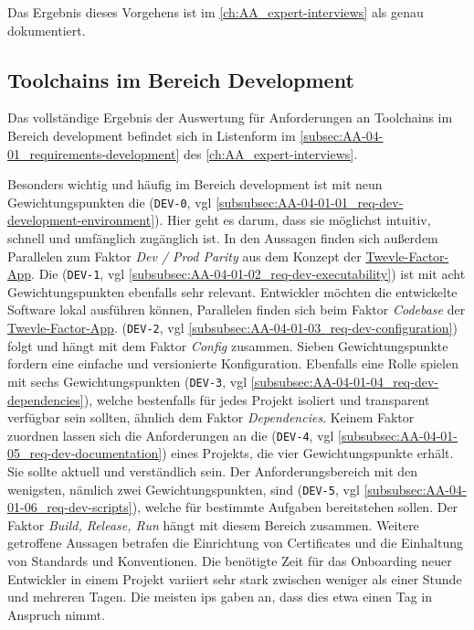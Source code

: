 Das Ergebnis dieses Vorgehens ist im \autoref{ch:AA_expert-interviews} als  genau dokumentiert.

\subsection{Toolchains im Bereich Development}
\label{subsec:04-02-02_toolchains-in-development}

Das vollständige Ergebnis der Auswertung für Anforderungen an Toolchains im Bereich \Gls{development} befindet sich in Listenform im \autoref{subsec:AA-04-01_requirements-development} des \autoref{ch:AA_expert-interviews}.

Besonders wichtig und häufig im Bereich \Gls{development} ist mit neun Gewichtungspunkten die \textbf{} (\texttt{DEV-0}, \acrshort{vgl} \autoref{subsubsec:AA-04-01-01_req-dev-development-environment}). Hier geht es darum, dass sie möglichst intuitiv, schnell und umfänglich zugänglich ist. In den Aussagen finden sich außerdem Parallelen zum Faktor \textit{Dev / Prod Parity} aus dem Konzept der \hyperref[sec:03-05_basic-idea-of-twelve-factor-app]{Twevle-Factor-App}. Die \textbf{} (\texttt{DEV-1}, \acrshort{vgl} \autoref{subsubsec:AA-04-01-02_req-dev-executability}) ist mit acht Gewichtungspunkten ebenfalls sehr relevant. Entwickler möchten die entwickelte Software lokal ausführen können, Parallelen finden sich beim Faktor \textit{Codebase} der \hyperref[sec:03-05_basic-idea-of-twelve-factor-app]{Twevle-Factor-App}. \textbf{} (\texttt{DEV-2}, \acrshort{vgl} \autoref{subsubsec:AA-04-01-03_req-dev-configuration}) folgt und hängt mit dem Faktor \textit{Config} zusammen. Sieben Gewichtungspunkte fordern eine einfache und versionierte Konfiguration. Ebenfalls eine Rolle spielen mit sechs Gewichtungspunkten \textbf{} (\texttt{DEV-3}, \acrshort{vgl} \autoref{subsubsec:AA-04-01-04_req-dev-dependencies}), welche bestenfalls für jedes Projekt isoliert und transparent verfügbar sein sollten, ähnlich dem Faktor \textit{Dependencies}. Keinem Faktor zuordnen lassen sich die Anforderungen an die \textbf{} (\texttt{DEV-4}, \acrshort{vgl} \autoref{subsubsec:AA-04-01-05_req-dev-documentation}) eines Projekts, die vier Gewichtungspunkte erhält. Sie sollte aktuell und verständlich sein. Der Anforderungsbereich mit den wenigsten, nämlich zwei Gewichtungspunkten, sind \textbf{} (\texttt{DEV-5}, \acrshort{vgl} \autoref{subsubsec:AA-04-01-06_req-dev-scripts}), welche für bestimmte Aufgaben bereitstehen sollen. Der Faktor \textit{Build, Release, Run} hängt mit diesem Bereich zusammen. Weitere getroffene Aussagen betrafen die Einrichtung von Certificates und die Einhaltung von Standards und Konventionen. Die benötigte Zeit für das Onboarding neuer Entwickler in einem Projekt variiert sehr stark zwischen weniger als einer Stunde und mehreren Tagen. Die meisten \Glspl{ip} gaben an, dass dies etwa einen Tag in Anspruch nimmt.

